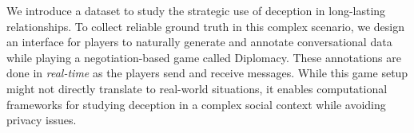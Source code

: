 
We introduce a dataset to study the strategic use of
deception in long-lasting relationships.
%
To collect reliable ground truth in this complex scenario, we design
an interface for players to naturally generate and annotate
conversational data while playing a negotiation-based game called
Diplomacy.
%
These annotations are done in \textit{real-time} as the players send
and receive messages.
%
While this game setup might not directly translate to real-world
situations, it enables computational frameworks for studying deception
in a complex social context while avoiding privacy issues.






